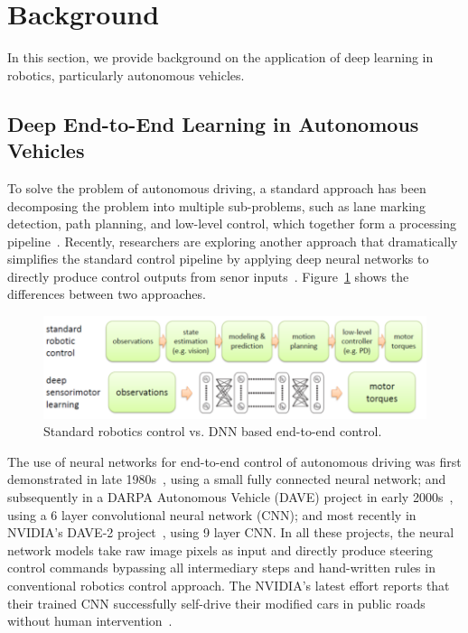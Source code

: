 \section{Background} \label{sec:background}

In this section, we provide background on the application of deep
learning in robotics, particularly autonomous vehicles.

\subsection{Deep End-to-End Learning in Autonomous Vehicles}


To solve the problem of autonomous driving, a standard approach has
been decomposing the problem into multiple sub-problems,
such as lane marking detection, path planning, and low-level
control, which together form a processing pipeline~\cite{Bojarski2016}.
Recently, researchers are exploring another approach that dramatically
simplifies the standard control pipeline by applying deep neural
networks to directly produce control outputs from senor
inputs~\cite{Levine2016}. Figure~\ref{fig:end-to-end-control}
shows the differences between two approaches.

\begin{figure}[h]
  \centering
  \includegraphics[width=.5\textwidth]{figs/endtoend}
  \caption{Standard robotics control vs. DNN based end-to-end
    control. }
  \label{fig:end-to-end-control}
\end{figure}

The use of neural networks for end-to-end control of autonomous
driving was first demonstrated in late 1980s~\cite{Pomerleau1989},
using a small fully connected neural network; and subsequently in a
DARPA Autonomous Vehicle (DAVE) project in early
2000s~\cite{LeCun:04}, using a 6 layer convolutional neural network
(CNN); and most recently in NVIDIA's DAVE-2
project~\cite{Bojarski2016}, using 9 layer CNN. In all these projects,
the neural network models take raw image pixels as input and directly
produce steering control commands bypassing all intermediary steps and
hand-written rules in conventional robotics control approach. The
NVIDIA's latest effort reports that their trained CNN successfully
self-drive their modified cars in public roads without human
intervention~\cite{Bojarski2016}.

